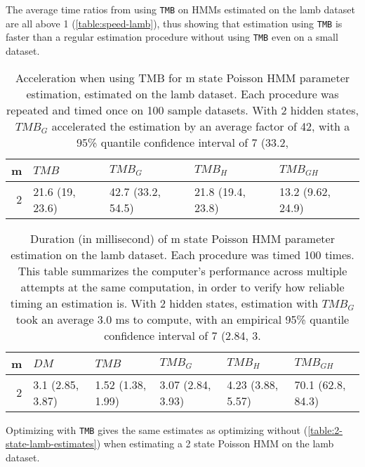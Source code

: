 \documentclass[bimj,fleqn]{w-art}\usepackage[]{graphicx}\usepackage[]{color}
\theoremstyle{plain}
\theoremstyle{definition}
\begin{document}
The average time ratios from using {\tt{TMB}} on HMMs estimated on the lamb dataset are all above 1 (\autoref{table:speed-lamb}), thus showing that estimation using {\tt{TMB}} is faster than a regular estimation procedure without using {\tt{TMB}} even on a small dataset.
\begin{table}[ht]
\centering
\begin{tabular}{rllll}
  \hline
m & \textit{${TMB}$} & \textit{${TMB_G}$} & \textit{${TMB_H}$} & \textit{${TMB_{GH}}$} \\ 
  \hline
2 & 21.6 (19, 23.6) & 42.7 (33.2, 54.5) & 21.8 (19.4, 23.8) & 13.2 (9.62, 24.9) \\ 
   \hline
\end{tabular}
\caption{Acceleration when using TMB for m state Poisson HMM parameter estimation, estimated on the lamb dataset. Each procedure was repeated and timed once on 100 sample datasets. With 2 hidden states, $TMB_G$ accelerated the estimation by an average factor of 42, with a 95\% quantile confidence interval of 7 (33.2,} 
\label{table:speed-lamb}
\end{table}


\begin{table}[ht]
\centering
\begin{tabular}{rlllll}
  \hline
m & \textit{${DM}$} & \textit{${TMB}$} & \textit{${TMB_G}$} & \textit{${TMB_H}$} & \textit{${TMB_{GH}}$} \\ 
  \hline
2 & 3.1 (2.85, 3.87) & 1.52 (1.38, 1.99) & 3.07 (2.84, 3.93) & 4.23 (3.88, 5.57) & 70.1 (62.8, 84.3) \\ 
   \hline
\end{tabular}
\caption{Duration (in millisecond) of m state Poisson HMM parameter estimation on the lamb dataset. Each procedure was timed 100 times. This table summarizes the computer's performance across multiple attempts at the same computation, in order to verify how reliable timing an estimation is. With 2 hidden states, estimation with $TMB_G$ took an average 3.0 ms to compute, with an empirical 95\% quantile confidence interval of 7 (2.84, 3.} 
\label{table:speed-consistency-lamb}
\end{table}


Optimizing with {\tt{TMB}} gives the same estimates as optimizing without (\autoref{table:2-state-lamb-estimates}) when estimating a 2 state Poisson HMM on the lamb dataset.
\end{document}
